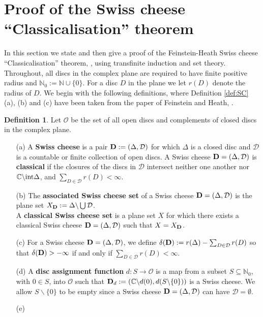 \documentclass{strippedproc-l}
\theoremstyle{definition}
\newtheorem{definition}[theorem]{Definition}
\theoremstyle{remark}
\numberwithin{equation}{section}
\begin{document}
\section{Proof of the Swiss cheese ``Classicalisation'' theorem}
\label{sec:Proof}
In this section we state and then give a proof of the Feinstein-Heath Swiss cheese ``Classicalisation'' theorem, \cite{Feinstein-Heath}, using transfinite induction and set theory. Throughout, all discs in the complex plane are required to have finite positive radius and $\mathbb{N}_{0}:=\mathbb{N}\cup\{0\}$. For a disc $D$ in the plane we let $r(D)$ denote the radius of $D$. We begin with the following definitions, where Definition \ref{def:SC} (a), (b) and (c) have been taken from the paper of Feinstein and Heath, \cite{Feinstein-Heath}.
\begin{definition}
Let $\mathcal{O}$ be the set of all open discs and complements of closed discs in the complex plane.
\begin{enumerate}
\item[\textup{(a)}]
A {\bf{Swiss cheese}} is a pair ${\bf{D}}:=(\Delta,\mathcal{D})$ for which $\Delta$ is a closed disc and $\mathcal{D}$ is a countable or finite collection of open discs. A Swiss cheese ${\bf{D}}=(\Delta,\mathcal{D})$ is {\bf{classical}} if the closures of the discs in $\mathcal{D}$ intersect neither one another nor $\mathbb{C}\backslash\mbox{\rm{int}}\Delta$, and $\sum_{D\in\mathcal{D}}r(D)<\infty$.
\item[\textup{(b)}]
The {\bf{associated Swiss cheese set}} of a Swiss cheese ${\bf{D}}=(\Delta,\mathcal{D})$ is the plane set  $X_{\bf{D}}:=\Delta\backslash\bigcup\mathcal{D}$.\\
A {\bf{classical Swiss cheese set}} is a plane set $X$ for which there exists a classical Swiss cheese ${\bf{D}}=(\Delta,\mathcal{D})$ such that $X=X_{\bf{D}}$. 
\item[\textup{(c)}]
For a Swiss cheese ${\bf{D}}=(\Delta,\mathcal{D})$, we define $\delta({\bf{D}}):=r(\Delta)-\sum_{D\in\mathcal{D}}r(D)$ so that $\delta({\bf{D}})>-\infty$ if and only if $\sum_{D\in\mathcal{D}}r(D)<\infty$.
\item[\textup{(d)}]
A {\bf{disc assignment function}} $d:S\rightarrow\mathcal{O}$ is a map from a subset $S\subseteq\mathbb{N}_{0}$, with $0\in S$, into $\mathcal{O}$ such that ${\bf{D}}_{d}:=(\mathbb{C}\backslash d(0),d(S\backslash\{0\}))$ is a Swiss cheese. We allow $S\backslash\{0\}$ to be empty since a Swiss cheese ${\bf{D}}=(\Delta,\mathcal{D})$ can have $\mathcal{D}=\emptyset$.
\item[\textup{(e)}]

\end{enumerate}
\end{definition}
\end{document}
